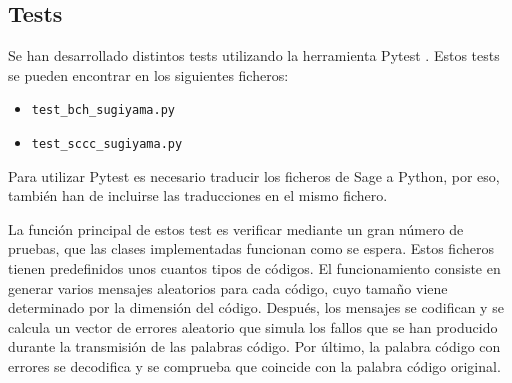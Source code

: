 \subsection{Tests}
Se han desarrollado distintos tests utilizando la herramienta Pytest \cite{pytest7.4.0}. Estos tests se pueden encontrar en los siguientes ficheros:

\begin{itemize}
    \item  \texttt{test\_bch\_sugiyama.py}
    \item  \texttt{test\_sccc\_sugiyama.py}
\end{itemize}

Para utilizar Pytest es necesario traducir los ficheros de Sage a Python, por eso, también han de incluirse las traducciones en el mismo fichero.

La función principal de estos test es verificar mediante un gran número de pruebas, que las clases implementadas funcionan como se espera. Estos ficheros tienen predefinidos unos cuantos tipos de códigos. El funcionamiento consiste en generar varios mensajes aleatorios para cada código, cuyo tamaño viene determinado por la dimensión del código. Después, los mensajes se codifican y se calcula un vector de errores aleatorio que simula los fallos que se han producido durante la transmisión de las palabras código. Por último, la palabra código con errores se decodifica y se comprueba que coincide con la palabra código original.



\endinput